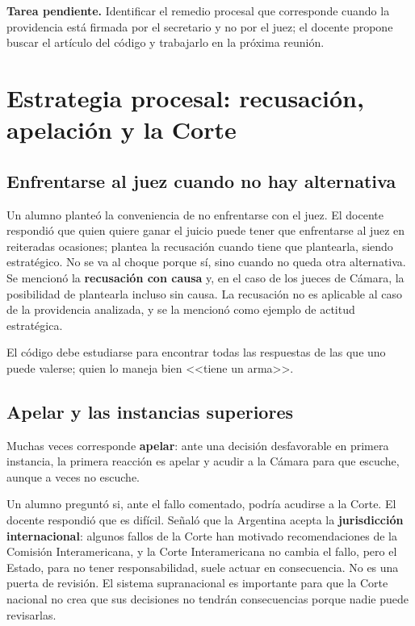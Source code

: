 \documentclass[12pt,oneside]{book}
\begin{document}
\begin{note}
\textbf{Tarea pendiente.} Identificar el remedio procesal que corresponde cuando la providencia está firmada por el secretario y no por el juez; el docente propone buscar el artículo del código y trabajarlo en la próxima reunión.
\end{note}

\section{Estrategia procesal: recusación, apelación y la Corte}

\subsection{Enfrentarse al juez cuando no hay alternativa}

Un alumno planteó la conveniencia de no enfrentarse con el juez. El docente respondió que quien quiere ganar el juicio puede tener que enfrentarse al juez en reiteradas ocasiones; plantea la recusación cuando tiene que plantearla, siendo estratégico. No se va al choque porque sí, sino cuando no queda otra alternativa. Se mencionó la \textbf{recusación con causa} y, en el caso de los jueces de Cámara, la posibilidad de plantearla incluso sin causa. La recusación no es aplicable al caso de la providencia analizada, y se la mencionó como ejemplo de actitud estratégica.

El código debe estudiarse para encontrar todas las respuestas de las que uno puede valerse; quien lo maneja bien <<tiene un arma>>.

\subsection{Apelar y las instancias superiores}

Muchas veces corresponde \textbf{apelar}: ante una decisión desfavorable en primera instancia, la primera reacción es apelar y acudir a la Cámara para que escuche, aunque a veces no escuche.

Un alumno preguntó si, ante el fallo comentado, podría acudirse a la Corte. El docente respondió que es difícil. Señaló que la Argentina acepta la \textbf{jurisdicción internacional}: algunos fallos de la Corte han motivado recomendaciones de la Comisión Interamericana, y la Corte Interamericana no cambia el fallo, pero el Estado, para no tener responsabilidad, suele actuar en consecuencia. No es una puerta de revisión. El sistema supranacional es importante para que la Corte nacional no crea que sus decisiones no tendrán consecuencias porque nadie puede revisarlas.
\end{document}
